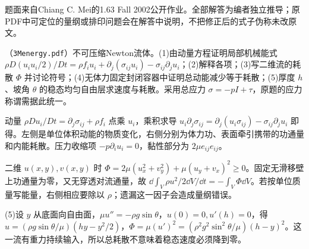 题面来自Chiang C. Mei的1.63 Fall 2002公开作业。全部解答为编者独立推导；原PDF中可定位的量纲或排印问题会在解答中说明，不把修正后的式子伪称未改原文。
\begin{exercise}
（\texttt{3Menergy.pdf}）不可压缩Newton流体。(1)由动量方程证明局部机械能式 $\rho D(u_iu_i/2)/Dt=\rho f_iu_i+\partial_j(\sigma_{ij}u_i)-\sigma_{ij}\partial_j u_i$；(2)解释各项；(3)写二维流的耗散 $\Phi$ 并讨论符号；(4)无体力固定封闭容器中证明总动能减少等于耗散；(5)厚度 $h$、坡角 $\theta$ 的稳态均匀自由层求速度与耗散。采用总应力 $\sigma=-pI+\tau$，原题的应力称谓需据此统一。
\end{exercise}
\begin{solution}
动量 $\rho Du_i/Dt=\partial_j\sigma_{ij}+\rho f_i$ 点乘 $u_i$，乘积求导 $u_i\partial_j\sigma_{ij}=\partial_j(u_i\sigma_{ij})-\sigma_{ij}\partial_j u_i$ 即得。左侧是单位体积动能的物质变化，右侧分别为体力功、表面牵引携带的功通量和内能耗散。压力收缩项 $-p\partial_i u_i=0$，黏性部分为 $2\mu e_{ij}e_{ij}$。

二维 $u(x,y),v(x,y)$ 时 $\Phi=2\mu(u_x^2+v_y^2)+\mu(u_y+v_x)^2\ge0$。固定无滑移壁上功通量为零，又无穿透对流通量，故 $\dd\int_V\rho u^2/2\dd V/\dd t=-\int_V\Phi\dd V$。若按单位质量写能量，右侧相应要除以 $\rho$；遗漏这一因子会造成量纲错误。

(5)设 $y$ 从底面向自由面，$\mu u''=-\rho g\sin\theta$，$u(0)=0,u'(h)=0$，得 $u=(\rho g\sin\theta/\mu)(hy-y^2/2)$，$\Phi=\mu(u')^2=(\rho^2g^2\sin^2\theta/\mu)(h-y)^2$。这一流有重力持续输入，所以总耗散不意味着稳态速度必须降到零。
\end{solution}

